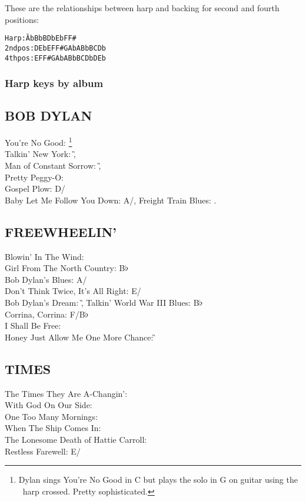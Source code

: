 \documentclass[a4paper,twoside]{memoir}
\begin{document}
These are the relationships between harp and backing for second and
fourth positions:
\begin{alltt}
Harp:    \G Ab \A Bb B \C Db \D Eb \E F F#
2nd pos: D Eb E F F# G Ab A Bb B C Db
4th pos: E F F# G Ab A Bb B C Db D Eb
\end{alltt}
\subsubsection*{Harp keys by album}

\subsection{BOB DYLAN}
You're No Good: \C\footnote{Dylan sings You're No Good in C but plays the solo in G on guitar using the \C~harp crossed. Pretty sophisticated.} \\
Talkin' New York: \G,\\
Man of Constant Sorrow: \G,\\
Pretty Peggy-O: \G\\ Gospel Plow: D/\G\\ Baby Let Me Follow You Down: A/\D,
Freight Train Blues: \C.


\subsection{FREEWHEELIN'}
Blowin' In The Wind: \D\\
Girl From The North Country: B$\flat$\\
Bob Dylan's Blues: A/\D\\
Don't Think Twice, It's All Right: E/\A\\
Bob Dylan's Dream: \G,
 Talkin' World War III Blues: B$\flat$\\
 Corrina, Corrina: F/B$\flat$\\
 I Shall Be Free: \G\\
 Honey Just Allow Me One More Chance: \G


\subsection{TIMES}
The Times They Are A-Changin': \G\\
With God On Our Side: \C\\
One Too Many Mornings: \C\\
When The Ship Comes In: \G\\
The Lonesome Death of Hattie Carroll: \E\\
Restless Farewell: E/\A
\end{document}
